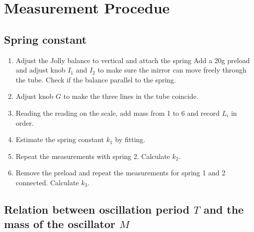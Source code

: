 \section{Measurement Procedue}


\subsection{Spring constant}

\begin{enumerate}
\item Adjust the Jolly balance to vertical and attach the spring Add a 20g
  preload and adjust knob $I_1$ and $I_2$ to make sure the mirror can move
  freely through the tube. Check if the balance parallel to the spring. 
\item Adjust knob $G$ to make the three lines in the tube coincide.
\item Reading the reading on the scale, add mass from 1 to 6 and record $L_i$ in
  order. 
\item Estimate the spring constant $k_1$ by fitting.
\item Repeat the measurements with spring 2. Calculate $k_2$.
\item Remove the preload and repeat the measurements for spring 1 and 2
  connected. Calculate $k_3$. 
\end{enumerate}

\subsection{Relation between oscillation period $T$ and the mass of the oscillator $M$} 

